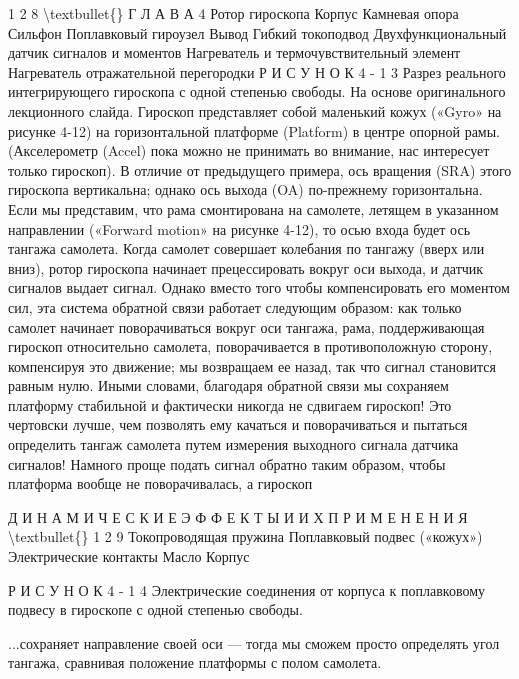 \documentclass[10pt,oneside]{article}
\begin{document}
1 2 8 \textbackslash{}textbullet\{\} Г Л А В А  4 Ротор гироскопа Корпус Камневая опора Сильфон Поплавковый гироузел Вывод Гибкий токоподвод Двухфункциональный датчик сигналов и моментов Нагреватель и термочувствительный элемент Нагреватель отражательной перегородки Р И С У Н О К  4 - 1 3 Разрез реального интегрирующего гироскопа с одной степенью свободы. На основе оригинального лекционного слайда. Гироскоп представляет собой маленький кожух («Gyro» на рисунке 4-12) на горизонтальной платформе (Platform) в центре опорной рамы. (Акселерометр (Accel) пока можно не принимать во внимание, нас интересует только гироскоп). В отличие от предыдущего примера, ось вращения (SRA) этого гироскопа вертикальна; однако ось выхода (OA) по-прежнему горизонтальна. Если мы представим, что рама смонтирована на самолете, летящем в указанном направлении («Forward motion» на рисунке 4-12), то осью входа будет ось тангажа самолета. Когда самолет совершает колебания по тангажу (вверх или вниз), ротор гироскопа начинает прецессировать вокруг оси выхода, и датчик сигналов выдает сигнал. Однако вместо того чтобы компенсировать его моментом сил, эта система обратной связи работает следующим образом: как только самолет начинает поворачиваться вокруг оси тангажа, рама, поддерживающая гироскоп относительно самолета, поворачивается в противоположную сторону, компенсируя это движение; мы возвращаем ее назад, так что сигнал становится равным нулю. Иными словами, благодаря обратной связи мы сохраняем платформу стабильной и фактически никогда не сдвигаем гироскоп! Это чертовски лучше, чем позволять ему качаться и поворачиваться и пытаться определить тангаж самолета путем измерения выходного сигнала датчика сигналов! Намного проще подать сигнал обратно таким образом, чтобы платформа вообще не поворачивалась, а гироскоп\par

Д И Н А М И Ч Е С К И Е  Э Ф Ф Е К Т Ы  И  И Х  П Р И М Е Н Е Н И Я \textbackslash{}textbullet\{\} 1 2 9 Токопроводящая пружина Поплавковый подвес («кожух») Электрические контакты Масло Корпус\par

Р И С У Н О К  4 - 1 4 Электрические соединения от корпуса к поплавковому подвесу в гироскопе с одной степенью свободы.\par

...сохраняет направление своей оси --- тогда мы сможем просто определять угол тангажа, сравнивая положение платформы с полом самолета.\par
\end{document}
